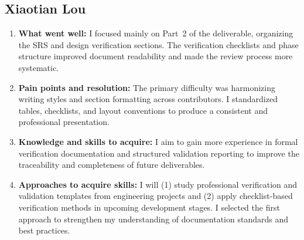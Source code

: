 \documentclass[12pt, titlepage]{article}
\begin{document}
\subsection*{Xiaotian Lou}
\begin{enumerate}
  \item \textbf{What went well:}  
  I focused mainly on Part~2 of the deliverable, organizing the SRS and design verification sections.
  The verification checklists and phase structure improved document readability and made the review
  process more systematic.

  \item \textbf{Pain points and resolution:}  
  The primary difficulty was harmonizing writing styles and section formatting across contributors.
  I standardized tables, checklists, and layout conventions to produce a consistent and professional
  presentation.

  \item \textbf{Knowledge and skills to acquire:}  
  I aim to gain more experience in formal verification documentation and structured validation
  reporting to improve the traceability and completeness of future deliverables.

  \item \textbf{Approaches to acquire skills:}  
  I will (1) study professional verification and validation templates from engineering projects and
  (2) apply checklist-based verification methods in upcoming development stages. I selected the
  first approach to strengthen my understanding of documentation standards and best practices.
\end{enumerate}
\end{document}
